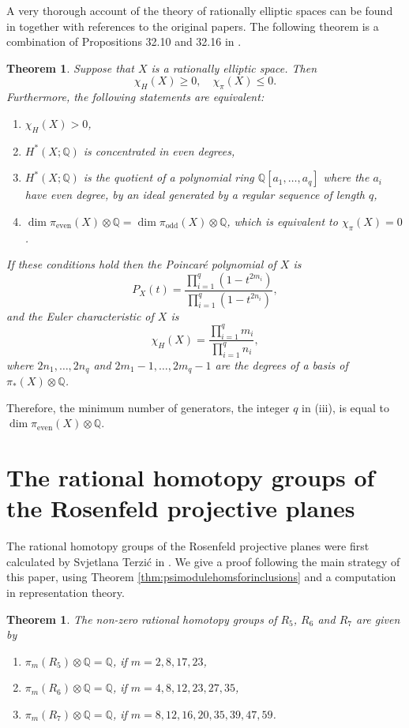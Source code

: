 \documentclass[twoside,a4paper,reqno,11pt]{amsart}
\newtheorem{theorem}[lemma]{Theorem}
\newcommand{\Q}{\mathbb{Q}}
\renewcommand{\o}{\otimes}
\begin{document}
A very thorough account of the theory of rationally elliptic spaces can be found in \cite[Section~32]{felix2001rational} together with references to the original papers. The following theorem is a combination of Propositions 32.10 and 32.16 in \cite{felix2001rational}. 

\begin{theorem} \label{thm:ellipticprops} Suppose that $X$ is a rationally elliptic space. Then
$$
\chi_H(X) \geq 0, \quad \chi_{\pi}(X) \leq 0.
$$
Furthermore, the following statements are equivalent:
\begin{enumerate}
\item
$\chi_H(X) > 0$,
\item
$H^*(X; \Q)$ is concentrated in even degrees,
\item
$H^*(X; \Q)$ is the quotient of a polynomial ring $\Q[a_1, \dots, a_q]$ where the $a_i$ have even degree, by an ideal generated by a regular sequence of length $q$,
\item
$ \dim \pi_{\text{even}}(X) \o \Q = \dim \pi_{\text{odd}}(X) \o \Q$, which is equivalent to $\chi_\pi(X) = 0$.
\end{enumerate}
If these conditions hold then the Poincar\'{e} polynomial of $X$ is
\[P_X(t) = \frac{\prod\limits_{i = 1}^q (1-t^{2m_i})}{\prod\limits_{i = 1}^q (1-t^{2n_i})},\] and the Euler characteristic of $X$ is \[ \chi_H(X) = \frac{\prod\limits_{i = 1}^q m_i }{\prod\limits_{i = 1}^q n_i}, \]
where $2n_1, \ldots, 2n_q$ and $2m_1-1, \ldots, 2m_q-1$ are the degrees of a basis of $\pi_*(X) \otimes \Q$. 

\end{theorem}
Therefore, the minimum number of generators, the integer $q$ in (iii), is equal to $\dim \pi_{\text{even}}(X) \o \Q$.

\section{The rational homotopy groups of the Rosenfeld projective planes} \label{sec:rathomRosenfeld}

The rational homotopy groups of the Rosenfeld projective planes were first calculated by Svjetlana Terzi\'{c} in \cite{MR2906538}. We give a proof following the main strategy of this paper, using Theorem \ref{thm:psimodulehomsforinclusions} and a computation in representation theory.

\begin{theorem} \label{thm:rathomgrpsRosenfeld}
The non-zero rational homotopy groups of $R_5$, $R_6$ and $R_7$ are given by
\begin{enumerate}
\item $\pi_m(R_5)\otimes\Q = \Q$, if $m = 2, 8, 17, 23$,
\item $\pi_m(R_6)\otimes\Q = \Q$, if $m = 4, 8, 12, 23, 27, 35$,
\item $\pi_m(R_7)\otimes\Q = \Q$, if $m = 8,12, 16, 20, 35, 39, 47, 59$.
\end{enumerate}
\end{theorem}
\end{document}
